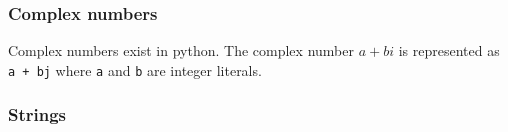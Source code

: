 \begin{Shaded}
\begin{Highlighting}[]
\NormalTok{(}\NormalTok{)}
\end{Highlighting}
\end{Shaded}

\begin{Shaded}
\begin{Highlighting}[]
\end{Highlighting}
\end{Shaded}

\begin{Shaded}
\begin{Highlighting}[]
\NormalTok{(}\NormalTok{)}
\end{Highlighting}
\end{Shaded}

\begin{Shaded}
\begin{Highlighting}[]
\end{Highlighting}
\end{Shaded}

\subsubsection{Complex
numbers}\label{python-introduction.md__complex-numbers}

Complex numbers exist in python. The complex number \(a + bi\) is
represented as \texttt{a\ +\ bj} where \texttt{a} and \texttt{b} are
integer literals.

\begin{Shaded}
\begin{Highlighting}[]
\NormalTok{(} \OperatorTok{+} \NormalTok{)}
\end{Highlighting}
\end{Shaded}

\begin{Shaded}
\begin{Highlighting}[]
\end{Highlighting}
\end{Shaded}

\subsubsection{Strings}\label{python-introduction.md__strings}

